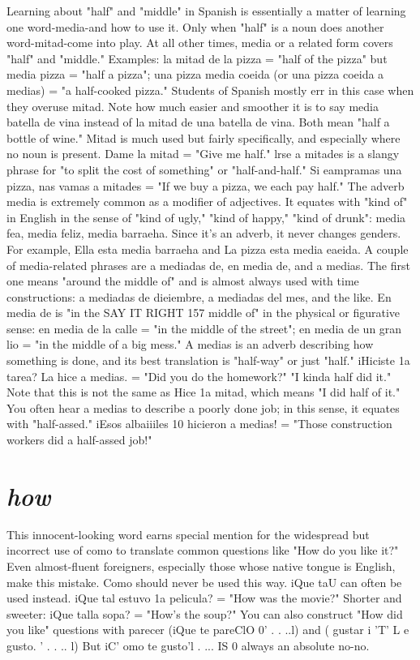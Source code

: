 \documentclass[14pt,a4paper,oneside]{memoir}
\begin{document}
{{{{%
Learning about "half" and "middle" in Spanish is essentially a
matter of learning one word-media-and how to use it. Only when
"half" is a noun does another word-mitad-come into play. At all
other times, media or a related form covers "half" and "middle." Examples: la mitad de la pizza = "half of the pizza" but media pizza =
"half a pizza"; una pizza media coeida (or una pizza coeida a medias)
= "a half-cooked pizza."
Students of Spanish mostly err in this case when they overuse
mitad. Note how much easier and smoother it is to say media batella
de vina instead of la mitad de una batella de vina. Both mean "half a
bottle of wine." Mitad is much used but fairly specifically, and especially where no noun is present. Dame la mitad = "Give me half."
lrse a mitades is a slangy phrase for "to split the cost of something" or
"half-and-half." Si eampramas una pizza, nas vamas a mitades = "If
we buy a pizza, we each pay half."
The adverb media is extremely common as a modifier of adjectives. It equates with "kind of" in English in the sense of "kind of
ugly," "kind of happy," "kind of drunk": media fea, media feliz, media
barraeha. Since it's an adverb, it never changes genders. For example,
Ella esta media barraeha and La pizza esta media eaeida.
A couple of media-related phrases are a mediadas de, en media de, and a medias. The first one means "around the middle of"
and is almost always used with time constructions: a mediadas de dieiembre, a mediadas del mes, and the like. En media de is "in the
SAY IT RIGHT 157
middle of" in the physical or figurative sense: en media de la calle
= "in the middle of the street"; en media de un gran lio = "in the
middle of a big mess." A medias is an adverb describing how something is done, and its best translation is "half-way" or just "half." iHiciste 1a tarea? La hice a medias. = "Did you do the homework?" "I
kinda half did it." Note that this is not the same as Hice 1a mitad,
which means "I did half of it." You often hear a medias to describe a
poorly done job; in this sense, it equates with "half-assed." iEsos albaiiiles 10 hicieron a medias! = "Those construction workers did a
half-assed job!"

\section{\emph{how}}

This innocent-looking word earns special mention for the
widespread but incorrect use of como to translate common questions
like "How do you like it?" Even almost-fluent foreigners, especially
those whose native tongue is English, make this mistake. Como
should never be used this way. iQue taU can often be used instead.
iQue tal estuvo 1a pelicula? = "How was the movie?" Shorter and
sweeter: iQue talla sopa? = "How's the soup?" You can also construct "How did you like" questions with parecer (iQue te pareClO 0' . . ..l) and ( gustar i 'T' L e gusto. ' . . .. l) But iC' omo te gusto'l . ... IS 0
always an absolute no-no.

}}}}
\end{document}
